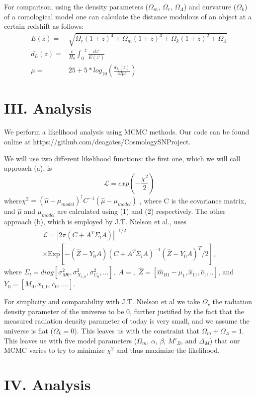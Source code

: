 \documentclass[aps,prl,reprint]{revtex4-1}
\begin{document}
For comparison, using the density parameters ($\Omega_m$, $\Omega_{r}$, $\Omega_{\Lambda}$) and curvature ($\Omega_k$) of a comological model one can calculate the distance modulous of an object at a certain redshift as follows:  
\begin{align}
E(z)=&\sqrt{\Omega_{r}(1+z)^4 + \Omega_m(1+z)^3 + \Omega_k(1+z)^2 + \Omega_{\Lambda}} \nonumber \\
d_L(z)=&\frac{c}{H_0} {\int_0}^z \frac{dz'}{E(z')} \nonumber \\
\mu =& 25 + 5*log_{10} \left( \frac{d_L(z)}{Mpc} \right)
\end{align}
 

\section{III. Analysis}
We perform a likelihood analysis using MCMC methods. Our code can be found online at https://github.com/deagates/CosmologySNProject.
\par We will use two different likelihood functions: the first one, which we will call approach (a), is $$\mathscr{L} = exp(-\frac{\chi^2}{2}) $$ where$\chi^2 = (\hat{\mu}-\mu_{model})^\dagger C^{-1} (\hat{\mu}-\mu_{model})$ \cite{sdss}, where C is the covariance matrix, and $\hat{\mu}$ and $\mu_{model}$ are calculated using (1) and (2) respectively. The other approach (b), which is employed by J.T. Nielson et al., uses \begin{align*}\mathscr{L} = |2\pi(C+A^T \Sigma_l A)|^{-1/2}\; \\
\times \text{Exp}[-(\hat{Z}-Y_0A)(C+A^T\Sigma_lA)^{-1}(\hat{Z}-Y_0A)^T/2],\end{align*} where $\Sigma_l = diag[\sigma_{M0}^2,\sigma_{X_{1,0}}^2,\sigma_{C_0}^2,...],$ $A = ,$ $\hat{Z} = [\hat{m}_{B1}-\mu_1, \hat{x}_{11},\hat{c}_1,..]$, and $Y_0 = [M_0,x_{1,0},c_0,....]$. 

 For simplicity and comparability with J.T. Nielson et al we take $\Omega_r$ the radiation density parameter of the universe to be 0, further justified by the fact that the measured radiation density parameter of today is very small, and we assume the universe is flat ($\Omega_k = 0$). This leaves us with the constraint that $\Omega_m + \Omega_{\Lambda} = 1 $. This leaves us with five model parameters ($\Omega_m$, $\alpha$, $\beta$, $M'_B$, and $\Delta_M$) that our MCMC varies to try to minimize ${\chi}^2$ and thus maximize the likelihood.
 
\section{IV. Analysis} 
 
 
\end{document}
